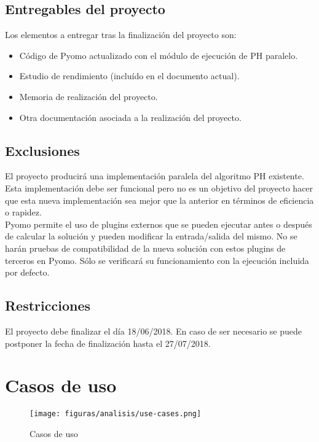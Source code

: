 \subsection{Entregables del proyecto}

Los elementos a entregar tras la finalización del proyecto son:

\begin{itemize}
    \item Código de Pyomo actualizado con el módulo de ejecución de PH paralelo.
    \item Estudio de rendimiento (incluído en el documento actual).
    \item Memoria de realización del proyecto.
    \item Otra documentación asociada a la realización del proyecto.
\end{itemize}

\subsection{Exclusiones}

El proyecto producirá una implementación paralela del algoritmo PH existente. Esta implementación debe ser funcional pero no es un objetivo del proyecto hacer que esta nueva implementación sea mejor que la anterior en términos de eficiencia o rapidez.\\

Pyomo permite el uso de plugins externos que se pueden ejecutar antes o después de calcular la solución y pueden modificar la entrada/salida del mismo. No se harán pruebas de compatibilidad de la nueva solución con estos plugins de terceros en Pyomo. Sólo se verificará su funcionamiento con la ejecución incluida por defecto.

\subsection{Restricciones}

El proyecto debe finalizar el día 18/06/2018. En caso de ser necesario se puede postponer la fecha de finalización hasta el 27/07/2018.

\section{Casos de uso}

\begin{figure}[H]
    \centerline{\texttt{[image: figuras/analisis/use-cases.png]}}
    \caption{Casos de uso}
    \label{fig:use-cases}
\end{figure}

